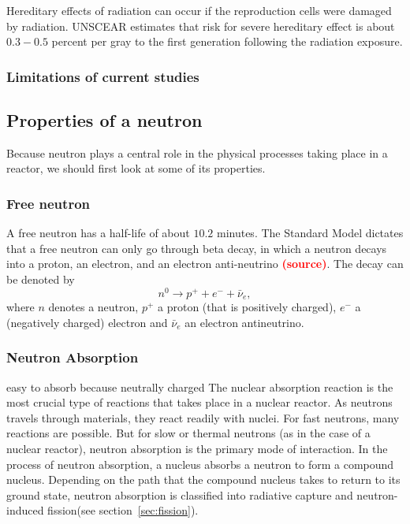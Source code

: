 \documentclass[nofootinbib,preprint,aip,pra]{revtex4-1}
\newcommand{\red}[1]{\textcolor{red}{\bf #1}}
\begin{document}
        Hereditary effects of radiation can occur if the reproduction cells were damaged by radiation.
        UNSCEAR estimates that risk for severe hereditary effect is about $0.3-0.5$ percent per gray to
        the first generation following the radiation exposure.\cite{u16, unscear12}

        \subsubsection{Limitations of current studies}
    \subsection{Properties of a neutron}
        Because neutron plays a central role in the physical processes taking
        place in a reactor, we should first look at some of its
        properties.
        \subsubsection{Free neutron}
        A free neutron has a half-life of about $10.2$ minutes. \cite{gc01} The Standard
        Model dictates that a free neutron can only go through beta decay, in which a neutron decays
        into a proton, an electron, and an electron anti-neutrino \red{(source)}. The decay can be denoted by
        \begin{equation}
            n^0 \rightarrow p^+ + e^- + \bar{\nu}_e,
        \end{equation}
        where $n$ denotes a neutron, $p^+$ a proton (that is positively charged), $e^-$ a
        (negatively charged) electron and $\bar{\nu}_e$ an electron antineutrino.

        \subsubsection{Neutron Absorption}
        \label{sec:capture}
        easy to absorb because neutrally charged
        The nuclear absorption reaction is the most crucial type of reactions that takes place in
        a nuclear reactor. As neutrons travels through materials, they react readily with nuclei.
        For fast neutrons, many reactions are possible. But for slow or thermal neutrons (as in the
        case of a nuclear reactor), neutron absorption is the primary mode of interaction.
        In the process of neutron absorption, a nucleus absorbs a neutron to form
        a compound nucleus. Depending on the path that the compound nucleus takes to return to its ground
        state, neutron absorption is classified into radiative capture and neutron-induced
        fission(see section~\ref{sec:fission}).
        
\end{document}
